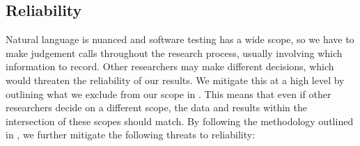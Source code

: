 \clearpage
\subsection{Reliability}\label{rel-valid}
Natural language is nuanced and software testing has a wide scope, so we have
to make judgement calls throughout the research process, usually involving
which information to record. Other researchers may make different decisions,
which would threaten the reliability of our results. We mitigate this at a high
level by outlining what we exclude from our scope in . This
means that even if other researchers decide on a different scope, the data and
results within the intersection of these scopes should match. By following the
methodology outlined in , we further mitigate the following
threats to reliability:

